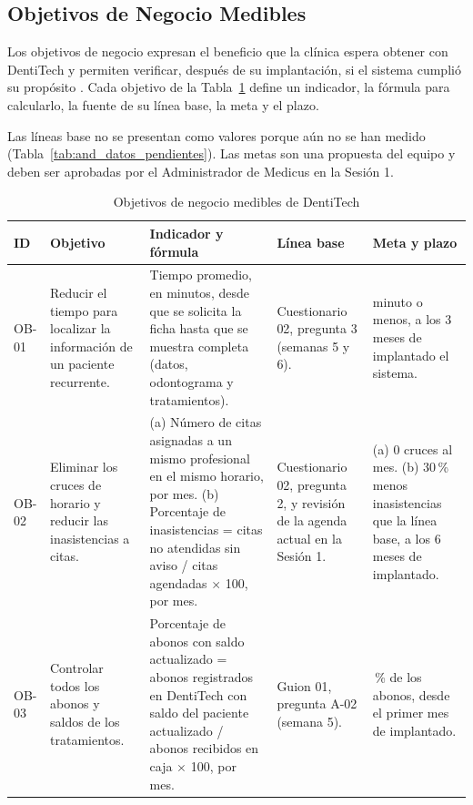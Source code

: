 \documentclass[12pt,a4paper]{article}
\begin{document}
\subsection{Objetivos de Negocio Medibles}

Los objetivos de negocio expresan el beneficio que la cl{\'i}nica espera obtener con DentiTech y permiten verificar, despu{\'e}s de su implantaci{\'o}n, si el sistema cumpli{\'o} su prop{\'o}sito \cite{wiegers2013}. Cada objetivo de la Tabla~\ref{tab:and_objetivos} define un indicador, la f{\'o}rmula para calcularlo, la fuente de su l{\'i}nea base, la meta y el plazo.

Las l{\'i}neas base no se presentan como valores porque a{\'u}n no se han medido (Tabla~\ref{tab:and_datos_pendientes}). Las metas son una propuesta del equipo y deben ser aprobadas por el Administrador de Medicus en la Sesi{\'o}n 1.

\begin{table}[htbp]
\centering
\caption{Objetivos de negocio medibles de DentiTech}
\label{tab:and_objetivos}
\small
\begin{tabularx}{\textwidth}{>{\raggedright\arraybackslash}p{0.9cm} >{\raggedright\arraybackslash}p{3.0cm} >{\raggedright\arraybackslash}X >{\raggedright\arraybackslash}p{2.6cm} >{\raggedright\arraybackslash}p{2.8cm}}
\toprule
\textbf{ID} & \textbf{Objetivo} & \textbf{Indicador y f{\'o}rmula} & \textbf{L{\'i}nea base} & \textbf{Meta y plazo} \\
\midrule
OB-01 & Reducir el tiempo para localizar la informaci{\'o}n de un paciente recurrente. & Tiempo promedio, en minutos, desde que se solicita la ficha hasta que se muestra completa (datos, odontograma y tratamientos). & Cuestionario 02, pregunta 3 (semanas 5 y 6). & 1 minuto o menos, a los 3 meses de implantado el sistema. \\
\addlinespace
OB-02 & Eliminar los cruces de horario y reducir las inasistencias a citas. & (a) N{\'u}mero de citas asignadas a un mismo profesional en el mismo horario, por mes. (b) Porcentaje de inasistencias = citas no atendidas sin aviso / citas agendadas $\times$ 100, por mes. & Cuestionario 02, pregunta 2, y revisi{\'o}n de la agenda actual en la Sesi{\'o}n 1. & (a) 0 cruces al mes. (b) 30\,\% menos inasistencias que la l{\'i}nea base, a los 6 meses de implantado. \\
\addlinespace
OB-03 & Controlar todos los abonos y saldos de los tratamientos. & Porcentaje de abonos con saldo actualizado = abonos registrados en DentiTech con saldo del paciente actualizado / abonos recibidos en caja $\times$ 100, por mes. & Guion 01, pregunta A-02 (semana 5). & 100\,\% de los abonos, desde el primer mes de implantado. \\
\bottomrule
\end{tabularx}
\end{table}
\end{document}

